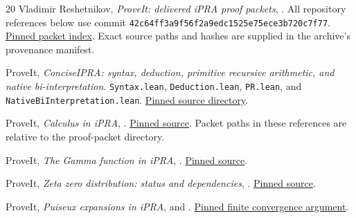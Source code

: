 \begin{thebibliography}{20}
\small
{}
Vladimir Reshetnikov, \emph{ProveIt: delivered iPRA proof packets},
.
All repository references below use commit
\texttt{42c64ff3a9f56f2a9edc1525e75ece3b720c7f77}.
\href{https://github.com/VladimirReshetnikov/ProveIt/blob/42c64ff3a9f56f2a9edc1525e75ece3b720c7f77/Logic/PrimitiveRecursiveArithmetic/docs/proofs/README.md}{Pinned packet index}.
Exact source paths and hashes are supplied in the archive's provenance manifest.

ProveIt, \emph{ConciseIPRA: syntax, deduction, primitive recursive arithmetic,
and native bi-interpretation}.
\allowbreak
\texttt{Syntax.lean}, \texttt{Deduction.lean}, \texttt{PR.lean},
and \texttt{NativeBiInterpretation.lean}.
\href{https://github.com/VladimirReshetnikov/ProveIt/tree/42c64ff3a9f56f2a9edc1525e75ece3b720c7f77/Logic/PrimitiveRecursiveArithmetic/ConciseIPRA/Lean/ConciseIPRA}{Pinned source directory}.

ProveIt, \emph{Calculus in iPRA},
.
\href{https://github.com/VladimirReshetnikov/ProveIt/blob/42c64ff3a9f56f2a9edc1525e75ece3b720c7f77/Logic/PrimitiveRecursiveArithmetic/docs/proofs/analysis/calculus_ipra/README.md}{Pinned source}.
Packet paths in these references are relative to the proof-packet directory.

ProveIt, \emph{The Gamma function in iPRA},
.
\href{https://github.com/VladimirReshetnikov/ProveIt/blob/42c64ff3a9f56f2a9edc1525e75ece3b720c7f77/Logic/PrimitiveRecursiveArithmetic/docs/proofs/analysis/gamma_ipra/README.md}{Pinned source}.

ProveIt, \emph{Zeta zero distribution: status and dependencies},
.
\href{https://github.com/VladimirReshetnikov/ProveIt/blob/42c64ff3a9f56f2a9edc1525e75ece3b720c7f77/Logic/PrimitiveRecursiveArithmetic/docs/proofs/analytic-number-theory/zeta_zeros_ipra_2026-11-15/sections/status.tex}{Pinned source}.

ProveIt, \emph{Puiseux expansions in iPRA},
 and
.
\href{https://github.com/VladimirReshetnikov/ProveIt/blob/42c64ff3a9f56f2a9edc1525e75ece3b720c7f77/Logic/PrimitiveRecursiveArithmetic/docs/proofs/algebra/puiseux_ipra/convergence.tex}{Pinned finite convergence argument}.


\end{thebibliography}
